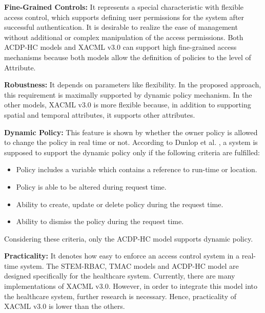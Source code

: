 \documentclass[conference]{IEEEtran}
\begin{document}
\textbf{Fine-Grained Controls: }
It represents a special characteristic with flexible access control, which supports defining user permissions for the system after successful authentication.  
It is desirable to realize the ease of management without additional or complex manipulation of the access permissions. 
Both ACDP-HC models and XACML v3.0 can support high fine-grained access mechanisms because both models allow the definition of policies to the level of Attribute.

\textbf{Robustness: }
It depends on parameters like flexibility.%
In the proposed approach, this requirement is maximally supported by dynamic policy mechanism. 
In the other models, XACML v3.0 is more flexible because, in addition to supporting spatial and temporal attributes, it supports other attributes.

\textbf{Dynamic Policy: }
This feature is shown by whether the owner policy is allowed to change the policy in real time or not. 
According to Dunlop et al. \cite{dunlop2001dynamic}, a system is supposed to support the dynamic policy only if the following criteria are fulfilled:
\begin{itemize}
	\item Policy includes a variable which contains a reference to run-time or location.
	\item Policy is able to be altered during request time.
	\item Ability to create, update or delete policy during the request time.
	\item Ability to dismiss the policy during the request time.
\end{itemize}
Considering these criteria, only the ACDP-HC model supports dynamic policy.

\textbf{Practicality: }
It denotes how easy to enforce an access control system in a real-time system.  
The STEM-RBAC, TMAC models and ACDP-HC model are designed specifically for the healthcare system. 
Currently, there are many implementations of XACML v3.0. 
However, in order to integrate this model into the healthcare system, further research is necessary. 
Hence, practicality of XACML v3.0 is lower than the others.
\end{document}
